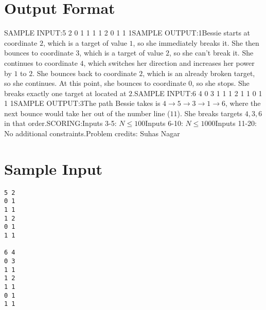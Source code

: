 \documentclass[12pt]{article}
\begin{document}
\section*{Output Format}
SAMPLE INPUT:5 2
0 1
1 1
1 2
0 1
1 1SAMPLE OUTPUT:1Bessie starts at coordinate $2$, which is a target of value $1$, so she
immediately breaks it. She then bounces to coordinate $3$, which is a target of
value $2$, so she can't break it. She continues to coordinate $4$, which
switches her direction and increases her power by $1$ to $2$. She bounces back
to coordinate $2$, which is an already broken target, so she continues. At this
point, she bounces to coordinate $0$, so she stops. She breaks exactly one
target at located at $2$.SAMPLE INPUT:6 4
0 3
1 1
1 2
1 1
0 1
1 1SAMPLE OUTPUT:3The path Bessie takes is $4\to 5\to 3\to 1\to 6$, where the next bounce would
take her out of the number line ($11$). She breaks targets $4, 3, 6$ in that
order.SCORING:Inputs 3-5: $N \le 100$Inputs 6-10: $N \le 1000$Inputs
11-20: No additional constraints.Problem credits: Suhas Nagar

\section*{Sample Input}
\begin{verbatim}
5 2
0 1
1 1
1 2
0 1
1 1

6 4
0 3
1 1
1 2
1 1
0 1
1 1
\end{verbatim}
\end{document}
